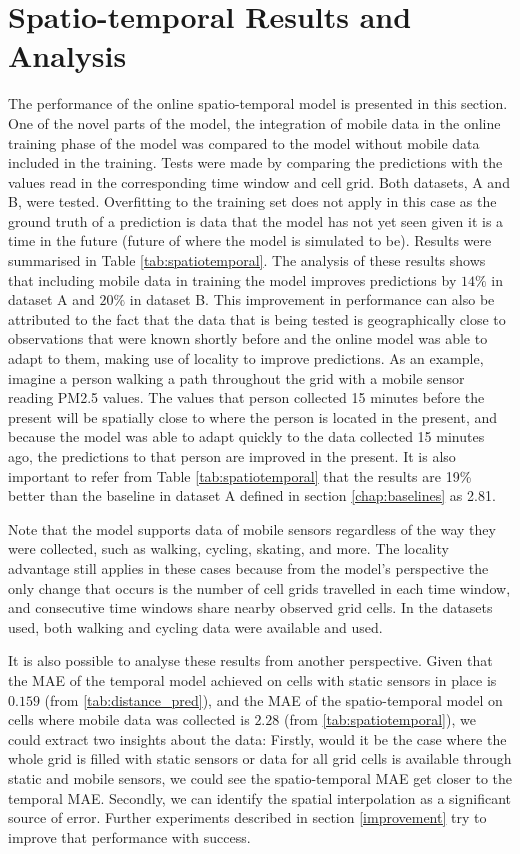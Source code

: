 \section{Spatio-temporal Results and Analysis}
\label{chap:st_results}

The performance of the online spatio-temporal model is presented in this section. One of the novel parts of the model, the integration of mobile data in the online training phase of the model was compared to the model without mobile data included in the training. Tests were made by comparing the predictions with the values read in the corresponding time window and cell grid. Both datasets, A and B, were tested. Overfitting to the training set does not apply in this case as the ground truth of a prediction is data that the model has not yet seen given it is a time in the future (future of where the model is simulated to be). Results were summarised in Table \ref{tab:spatiotemporal}. The analysis of these results shows that including mobile data in training the model improves predictions by $14\%$ in dataset A and $20\%$ in dataset B. 
This improvement in performance can also be attributed to the fact that the data that is being tested is geographically close to observations that were known shortly before and the online model was able to adapt to them, making use of locality to improve predictions. As an example, imagine a person walking a path throughout the grid with a mobile sensor reading PM2.5 values. The values that person collected 15 minutes before the present will be spatially close to where the person is located in the present, and because the model was able to adapt quickly to the data collected 15 minutes ago, the predictions to that person are improved in the present.
It is also important to refer from Table \ref{tab:spatiotemporal} that the results are 19\% better than the baseline in dataset A defined in section \ref{chap:baselines} as 2.81.

Note that the model supports data of mobile sensors regardless of the way they were collected, such as walking, cycling, skating, and more. The locality advantage still applies in these cases because from the model's perspective the only change that occurs is the number of cell grids travelled in each time window, and consecutive time windows share nearby observed grid cells. In the datasets used, both walking and cycling data were available and used.

It is also possible to analyse these results from another perspective. Given that the MAE of the temporal model achieved on cells with static sensors in place is $0.159$ (from \ref{tab:distance_pred}), and the MAE of the spatio-temporal model on cells where mobile data was collected is $2.28$ (from \ref{tab:spatiotemporal}), we could extract two insights about the data: Firstly, would it be the case where the whole grid is filled with static sensors or data for all grid cells is available through static and mobile sensors, we could see the spatio-temporal MAE get closer to the temporal MAE. Secondly, we can identify the spatial interpolation as a significant source of error. Further experiments described in section \ref{improvement} try to improve that performance with success.



